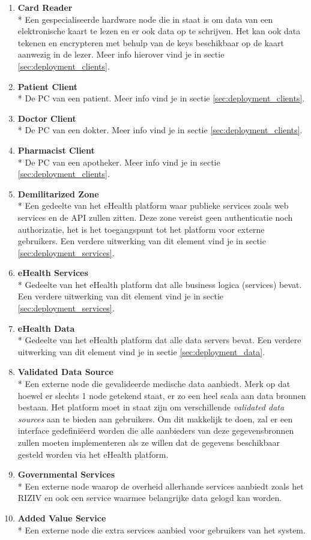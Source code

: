 \documentclass[a4paper,10pt]{article}
\begin{document}
\begin{enumerate}
\item \textbf{Card Reader}\\*
Een gespecialiseerde hardware node die in staat is om data van een elektronische kaart te lezen en er ook data op te schrijven. Het kan ook data tekenen en encrypteren met behulp van de keys beschikbaar op de kaart aanwezig in de lezer. Meer info hierover vind je in sectie \ref{sec:deployment_clients}.
\item \textbf{Patient Client}\\*
De PC van een patient. Meer info vind je in sectie \ref{sec:deployment_clients}.
\item \textbf{Doctor Client}\\*
De PC van een dokter. Meer info vind je in sectie \ref{sec:deployment_clients}.
\item \textbf{Pharmacist Client}\\*
De PC van een apotheker. Meer info vind je in sectie \ref{sec:deployment_clients}.
\item \textbf{Demilitarized Zone}\\*
Een gedeelte van het eHealth platform waar publieke services zoals web services en de API zullen zitten. Deze zone vereist geen authenticatie noch authorizatie, het is het toegangspunt tot het platform voor externe gebruikers. Een verdere uitwerking van dit element vind je in sectie \ref{sec:deployment_services}.
\item \textbf{eHealth Services}\\*
Gedeelte van het eHealth platform dat alle business logica (services) bevat. Een verdere uitwerking van dit element vind je in sectie \ref{sec:deployment_services}.
\item \textbf{eHealth Data}\\*
Gedeelte van het eHealth platform dat alle data servers bevat. Een verdere uitwerking van dit element vind je in sectie \ref{sec:deployment_data}.
\item \textbf{Validated Data Source}\\*
Een externe node die gevalideerde medische data aanbiedt. Merk op dat hoewel er slechts 1 node getekend staat, er zo een heel scala aan data bronnen bestaan. Het platform moet in staat zijn om verschillende \textit{validated data sources} aan te bieden aan gebruikers. Om dit makkelijk te doen, zal er een interface gedefiniëerd worden die alle aanbieders van deze gegevensbronnen zullen moeten implementeren als ze willen dat de gegevens beschikbaar gesteld worden via het eHealth platform.
\item \textbf{Governmental Services}\\*
Een externe node waarop de overheid allerhande services aanbiedt zoals het RIZIV en ook een service waarmee belangrijke data gelogd kan worden.
\item \textbf{Added Value Service}\\*
Een externe node die extra services aanbied voor gebruikers van het system.
\end{enumerate}
\end{document}
